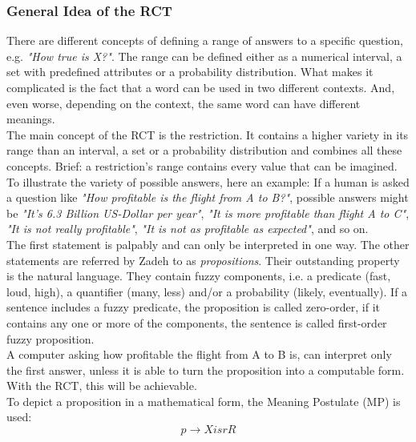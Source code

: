 \documentclass[conference]{IEEEtran}
\begin{document}
\subsubsection{General Idea of the RCT}
There are different concepts of defining a range of answers to a specific question, e.g. \emph{"How true is X?"}. The range can be defined either as a numerical interval, a set with predefined attributes or a probability distribution. What makes it complicated is the fact that a word can be used in two different contexts. And, even worse, depending on the context, the same word can have different meanings.\\
The main concept of the RCT is the restriction. It contains a higher variety in its range than an interval, a set or a probability distribution and combines all these concepts. Brief: a restriction's range contains every value that can be imagined. To illustrate the variety of possible answers, here an example: If a human is asked a question like \emph{"How profitable is the flight from A to B?"}, possible answers might be \emph{"It's 6.3 Billion US-Dollar per year"}, \emph{"It is more profitable than flight A to C"}, \emph{"It is not really profitable"}, \emph{"It is not as profitable as expected"}, and so on.\\
The first statement is palpably and can only be interpreted in one way. The other statements are referred by Zadeh \cite{zadeh2013} to as \emph{propositions}. Their outstanding property is the natural language. They contain fuzzy components, i.e. a predicate (fast, loud, high), a quantifier (many, less) and/or a probability (likely, eventually). If a sentence includes a fuzzy predicate, the proposition is called zero-order, if it contains any one or more of the components, the sentence is called first-order fuzzy proposition.\\ 
A computer asking how profitable the flight from A to B is, can interpret only the first answer, unless it is able to turn the proposition into a computable form. With the RCT, this will be achievable.\\
To depict a proposition in a mathematical form, the Meaning Postulate (MP) is used:
\begin{equation} \label{eq:mp}
p \rightarrow X isr R
\end{equation}
\end{document}
